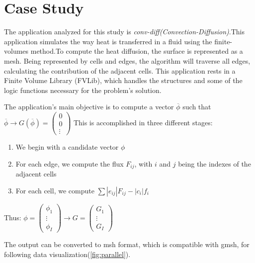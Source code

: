 \documentclass[a4paper,10pt,openright,openbib,twocolumn]{article}
\begin{document}
\section{Case Study}

The application analyzed for this study is \emph{conv-diff(Convection-Diffusion)}.This application simulates the way heat is transferred in a fluid using the finite-volumes method.To compute the heat diffusion, the surface is represented as a mesh. Being represented by cells and edges, the algorithm will traverse all edges, calculating the contribution of the adjacent cells. This application rests in a Finite Volume Library (FVLib), which handles the structures and some of the logic functions necessary for the problem's solution.

The application's main objective is to compute a vector $\overline{\phi}$ such that $\overline{\phi} \longrightarrow G(\overline{\phi}) = \left(\begin{array}{c}
0\\
0\\
\vdots\end{array}\right)$
This is accomplished in three different stages:
\begin{enumerate}
    \item {We begin with a candidate vector $\phi$}
    \item {For each edge, we compute the flux $F_{ij}$, with $i$ and $j$ being the indexes of the adjacent cells}
    \item {For each cell, we compute $\sum |e_{ij}| F_{ij} - |c_i| f_i$}
\end{enumerate}
Thus: $\phi = \left(\begin{array}{c}
\phi_1\\
\vdots\\
\phi_I
\end{array}\right) \longrightarrow G = \left(\begin{array}{c}
G_1\\
\vdots\\
G_I
\end{array}\right)$


The output can be converted to msh format, which is compatible with gmsh, for following data visualization(\cref{fig:parallel}).
\end{document}
